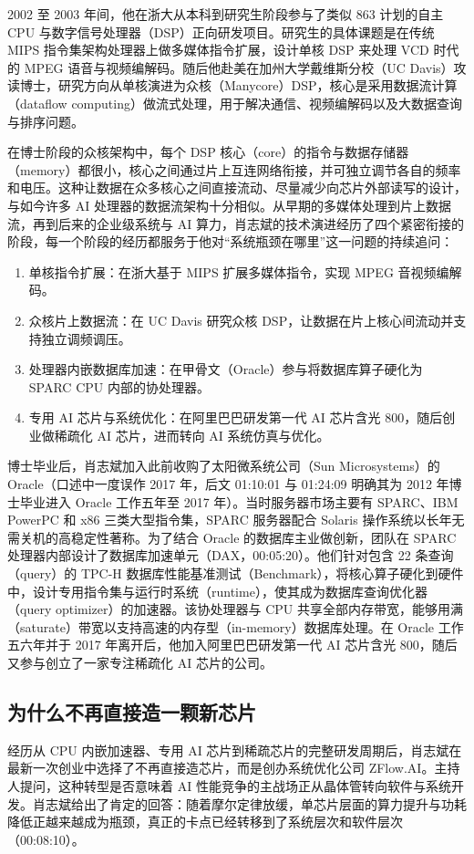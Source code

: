 \documentclass[UTF8,a4paper,11pt,fontset=fandol]{ctexart}
\begin{document}
2002 至 2003 年间，他在浙大从本科到研究生阶段参与了类似 863 计划的自主 CPU 与数字信号处理器（DSP）正向研发项目。研究生的具体课题是在传统 MIPS 指令集架构处理器上做多媒体指令扩展，设计单核 DSP 来处理 VCD 时代的 MPEG 语音与视频编解码。随后他赴美在加州大学戴维斯分校（UC Davis）攻读博士，研究方向从单核演进为众核（Manycore）DSP，核心是采用数据流计算（dataflow computing）做流式处理，用于解决通信、视频编解码以及大数据查询与排序问题。

在博士阶段的众核架构中，每个 DSP 核心（core）的指令与数据存储器（memory）都很小，核心之间通过片上互连网络衔接，并可独立调节各自的频率和电压。这种让数据在众多核心之间直接流动、尽量减少向芯片外部读写的设计，与如今许多 AI 处理器的数据流架构十分相似。从早期的多媒体处理到片上数据流，再到后来的企业级系统与 AI 算力，肖志斌的技术演进经历了四个紧密衔接的阶段，每一个阶段的经历都服务于他对“系统瓶颈在哪里”这一问题的持续追问：
\begin{enumerate}
\item 单核指令扩展：在浙大基于 MIPS 扩展多媒体指令，实现 MPEG 音视频编解码。
\item 众核片上数据流：在 UC Davis 研究众核 DSP，让数据在片上核心间流动并支持独立调频调压。
\item 处理器内嵌数据库加速：在甲骨文（Oracle）参与将数据库算子硬化为 SPARC CPU 内部的协处理器。
\item 专用 AI 芯片与系统优化：在阿里巴巴研发第一代 AI 芯片含光 800，随后创业做稀疏化 AI 芯片，进而转向 AI 系统仿真与优化。
\end{enumerate}

博士毕业后，肖志斌加入此前收购了太阳微系统公司（Sun Microsystems）的 Oracle（口述中一度误作 2017 年，后文 01:10:01 与 01:24:09 明确其为 2012 年博士毕业进入 Oracle 工作五年至 2017 年）。当时服务器市场主要有 SPARC、IBM PowerPC 和 x86 三类大型指令集，SPARC 服务器配合 Solaris 操作系统以长年无需关机的高稳定性著称。为了结合 Oracle 的数据库主业做创新，团队在 SPARC 处理器内部设计了数据库加速单元（DAX，00:05:20）。他们针对包含 22 条查询（query）的 TPC-H 数据库性能基准测试（Benchmark），将核心算子硬化到硬件中，设计专用指令集与运行时系统（runtime），使其成为数据库查询优化器（query optimizer）的加速器。该协处理器与 CPU 共享全部内存带宽，能够用满（saturate）带宽以支持高速的内存型（in-memory）数据库处理。在 Oracle 工作五六年并于 2017 年离开后，他加入阿里巴巴研发第一代 AI 芯片含光 800，随后又参与创立了一家专注稀疏化 AI 芯片的公司。

\subsection{为什么不再直接造一颗新芯片}
经历从 CPU 内嵌加速器、专用 AI 芯片到稀疏芯片的完整研发周期后，肖志斌在最新一次创业中选择了不再直接造芯片，而是创办系统优化公司 ZFlow.AI。主持人提问，这种转型是否意味着 AI 性能竞争的主战场正从晶体管转向软件与系统开发。肖志斌给出了肯定的回答：随着摩尔定律放缓，单芯片层面的算力提升与功耗降低正越来越成为瓶颈，真正的卡点已经转移到了系统层次和软件层次（00:08:10）。
\end{document}
